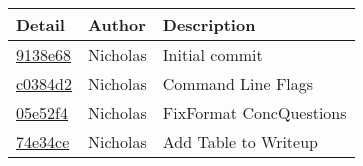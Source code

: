 \begin{tabular}{l l p{1.5in}}\textbf{Detail} & \textbf{Author} & \textbf{Description}\\\hline
\href{https://github.com/Skinnern/CS444/commit/9138e6857021329354027c49c35fea1604fd5585}{9138e68} & Nicholas & Initial commit\\\hline
\href{https://github.com/Skinnern/CS444/commit/c0384d23d8fbcb4f73b26ab0fea4e7736f443359}{c0384d2} & Nicholas & Command Line Flags\\\hline
\href{https://github.com/Skinnern/CS444/commit/05e52f4b508b9f440e9cb84cf2e2baa3ba738219}{05e52f4} & Nicholas & FixFormat ConcQuestions\\\hline
\href{https://github.com/Skinnern/CS444/commit/74e34ce8bf215a03c8a2ea6e45e4887e311d3972}{74e34ce} & Nicholas & Add Table to Writeup\\\hline
\end{tabular}
